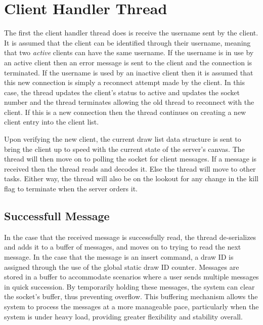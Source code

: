 \documentclass[12pt, a4paper]{report}
\begin{document}
\section{Client Handler Thread}
The first the client handler thread does is receive the username sent by the client. It is assumed that the client can be identified through their username, meaning that two \textit{active} clients can have the same username. If the username is in use by an active client then an error message is sent to the client and the connection is terminated. If the username is used by an inactive client then it is assumed that this new connection is simply a reconnect attempt made by the client. In this case, the thread updates the client's status to active and updates the socket number and the thread terminates allowing the old thread to reconnect with the client. If this is a new connection then the thread continues on creating a new client entry into the client list.

Upon verifying the new client, the current draw list data structure is sent to bring the client up to speed with the current state of the server's canvas. The thread will then move on to polling the socket for client messages. If a message is received then the thread reads and decodes it. Else the thread will move to other tasks. Either way, the thread will also be on the lookout for any change in the kill flag to terminate when the server orders it.

\subsection{Successfull Message}
In the case that the received message is successfully read, the thread de-serializes and adds it to a buffer of messages, and moves on to trying to read the next message. In the case that the message is an insert command, a draw ID is assigned through the use of the global static draw ID counter. Messages are stored in a buffer to accommodate scenarios where a user sends multiple messages in quick succession. By temporarily holding these messages, the system can clear the socket's buffer, thus preventing overflow. This buffering mechanism allows the system to process the messages at a more manageable pace, particularly when the system is under heavy load, providing greater flexibility and stability overall.
\end{document}
